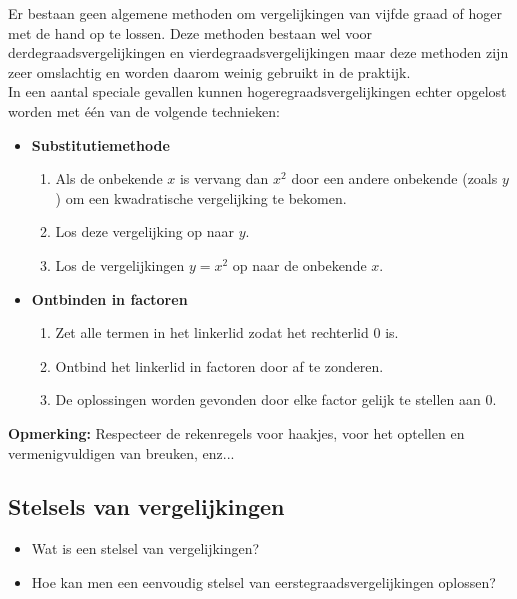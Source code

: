 \begin{framed}
Er bestaan geen algemene methoden om vergelijkingen van vijfde graad of hoger met de hand op te lossen. Deze methoden bestaan wel voor derdegraadsvergelijkingen en vierdegraadsvergelijkingen maar deze methoden zijn zeer omslachtig en worden daarom weinig gebruikt in de praktijk.\\

In een aantal speciale gevallen kunnen hogeregraadsvergelijkingen echter opgelost worden met \'{e}\'{e}n van de volgende technieken:
\begin{itemize}
	\item {\bf Substitutiemethode}
\begin{enumerate}
	\item Als de onbekende $x$ is vervang dan $x^2$ door een andere onbekende (zoals $y$) om een kwadratische vergelijking te bekomen.
	\item Los deze vergelijking op naar $y$.
	\item Los de vergelijkingen $y=x^2$ op naar de onbekende $x$.
\end{enumerate}

\item {\bf Ontbinden in factoren}
\begin{enumerate}
	\item Zet alle termen in het linkerlid zodat het rechterlid $0$ is.
	\item Ontbind het linkerlid in factoren door af te zonderen.
	\item De oplossingen worden gevonden door elke factor gelijk te stellen aan $0$.
\end{enumerate}
	
	
\end{itemize}

{\bf Opmerking:} Respecteer de rekenregels voor haakjes, voor het optellen en vermenigvuldigen van breuken, enz...\\

\end{framed}

\newpage

\subsection{Stelsels van vergelijkingen}

\begin{itemize}
	\item Wat is een stelsel van vergelijkingen?
	\item Hoe kan men een eenvoudig stelsel van eerstegraadsvergelijkingen oplossen?
\end{itemize}

